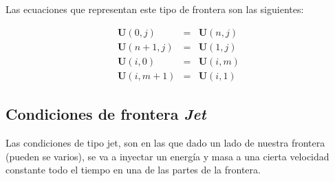\documentclass[12pt,a4paper]{book}
\begin{document}
Las ecuaciones que representan este tipo de frontera son las siguientes:

\begin{eqnarray}
\textbf{U}(0,j)&=&\textbf{U}(n,j) \\
\textbf{U}(n+1,j)&=&\textbf{U}(1,j) \\
\textbf{U}(i,0)&=&\textbf{U}(i,m) \\
\textbf{U}(i,m+1)&=&\textbf{U}(i,1) 
\end{eqnarray}


\subsection{Condiciones de frontera \emph{Jet} }

Las condiciones de tipo jet, son en las que dado un lado de nuestra frontera (pueden se varios), se va a inyectar un energía y masa a una cierta velocidad constante todo el tiempo en una de las partes de la frontera.
\end{document}
